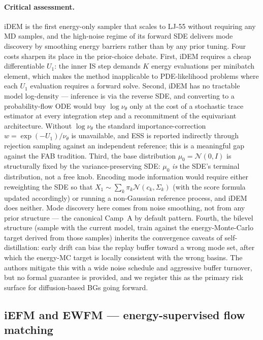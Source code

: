 \documentclass[11pt,letterpaper]{article}
\theoremstyle{plain}
\begin{document}
\paragraph{Critical assessment.} iDEM is the first energy-only sampler that
scales to LJ-55 without requiring any MD samples, and the high-noise regime
of its forward SDE delivers mode discovery by smoothing energy barriers
rather than by any prior tuning. Four costs sharpen its place in the
prior-choice debate. First, iDEM requires a cheap differentiable $U_1$: the
inner IS step demands $K$ energy evaluations per minibatch element, which
makes the method inapplicable to PDE-likelihood problems where each $U_1$
evaluation requires a forward solve. Second, iDEM has no tractable model
log-density --- inference is via the reverse SDE, and converting to a
probability-flow ODE would buy $\log\nu_\theta$ only at the cost of a
stochastic trace estimator at every integration step and a recommitment of
the equivariant architecture. Without $\log\nu_\theta$ the standard
importance-correction $w=\exp(-U_1)/\nu_\theta$ is unavailable, and ESS is
reported indirectly through rejection sampling against an independent
reference; this is a meaningful gap against the FAB tradition. Third, the
base distribution $\mu_0=\mathcal N(0,I)$ is structurally fixed by the
variance-preserving SDE: $\mu_0$ \emph{is} the SDE's terminal distribution,
not a free knob. Encoding mode information would require either reweighting
the SDE so that $X_1\sim\sum_k\pi_k\mathcal N(c_k,\Sigma_k)$ (with the score
formula updated accordingly) or running a non-Gaussian reference process, and
iDEM does neither. Mode discovery here comes from noise smoothing, not from
any prior structure --- the canonical Camp~A by default pattern. Fourth, the
bilevel structure (sample with the current model, train against the
energy-Monte-Carlo target derived from those samples) inherits the
convergence caveats of self-distillation: early drift can bias the replay
buffer toward a wrong mode set, after which the energy-MC target is locally
consistent with the wrong basins. The authors mitigate this with a wide noise
schedule and aggressive buffer turnover, but no formal guarantee is provided,
and we register this as the primary risk surface for diffusion-based BGs
going forward.

\subsection{iEFM and EWFM --- energy-supervised flow matching}\label{sec:iefm-ewfm}
\end{document}
